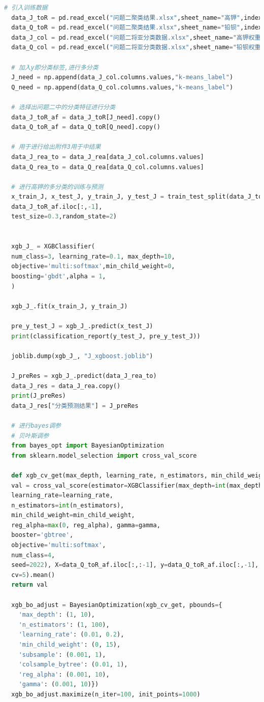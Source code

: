 \documentclass[withoutpreface,bwprint]{cumcmthesis} %
\begin{document}
\begin{appendices}
\begin{lstlisting}[language=python]
  # 引入训练数据
  data_J_toR = pd.read_excel("问题二聚类结果.xlsx",sheet_name="高钾",index_col=0)
  data_Q_toR = pd.read_excel("问题二聚类结果.xlsx",sheet_name="铅钡",index_col=0)
  data_J_col = pd.read_excel("问题二将亚分类数据.xlsx",sheet_name="高钾权重")
  data_Q_col = pd.read_excel("问题二将亚分类数据.xlsx",sheet_name="铅钡权重")
  
  # 加入y即分类标签,进行多分类
  J_need = np.append(data_J_col.columns.values,"k-means_label")
  Q_need = np.append(data_Q_col.columns.values,"k-means_label")
  
  # 选择出问题二中的分类特征进行分类
  data_J_toR_af = data_J_toR[J_need].copy()
  data_Q_toR_af = data_Q_toR[Q_need].copy()
  
  # 用于进行给出附件3用于中结果
  data_J_rea_to = data_J_rea[data_J_col.columns.values]
  data_Q_rea_to = data_Q_rea[data_Q_col.columns.values]
  
  # 进行高钾的多分类的训练与预测
  x_train_J, x_test_J, y_train_J, y_test_J = train_test_split(data_J_toR_af.iloc[:,:-1],
  data_J_toR_af.iloc[:,-1],
  test_size=0.3,random_state=2)
  
  
  xgb_J_ = XGBClassifier(
  num_class=3, learning_rate=0.1, max_depth=10, 
  objective='multi:softmax',min_child_weight=0,
  boosting='gbdt',alpha = 1,
  )
  
  xgb_J_.fit(x_train_J, y_train_J)
  
  pre_y_test_J = xgb_J_.predict(x_test_J)
  print(classification_report(y_test_J, pre_y_test_J))
  
  joblib.dump(xgb_J_, "J_xgboost.joblib")
  
  J_preRes = xgb_J_.predict(data_J_rea_to)
  data_J_res = data_J_rea.copy()
  print(J_preRes)
  data_J_res["分类预测结果"] = J_preRes
  
  # 进行bayes调参
  # 贝叶斯调参
  from bayes_opt import BayesianOptimization
  from sklearn.model_selection import cross_val_score
  
  def xgb_cv_get(max_depth, learning_rate, n_estimators, min_child_weight, subsample, colsample_bytree, reg_alpha, gamma):
  val = cross_val_score(estimator=XGBClassifier(max_depth=int(max_depth),
  learning_rate=learning_rate,
  n_estimators=int(n_estimators),
  min_child_weight=min_child_weight,
  reg_alpha=max(0, reg_alpha), gamma=gamma,
  booster='gbtree',
  objective='multi:softmax',
  num_class=4,
  seed=2022), X=data_Q_toR_af.iloc[:,:-1], y=data_Q_toR_af.iloc[:,-1], scoring="f1_macro",
  cv=5).mean()
  return val
  
  xgb_bo_adjust = BayesianOptimization(xgb_cv_get, pbounds={
    'max_depth': (1, 10),
    'n_estimators': (1, 100),
    'learning_rate': (0.01, 0.2),
    'min_child_weight': (0, 15),
    'subsample': (0.001, 1),
    'colsample_bytree': (0.01, 1),
    'reg_alpha': (0.001, 10),
    'gamma': (0.001, 10)})
  xgb_bo_adjust.maximize(n_iter=100, init_points=1000)
  

\end{lstlisting}
\end{appendices}
\end{document}
